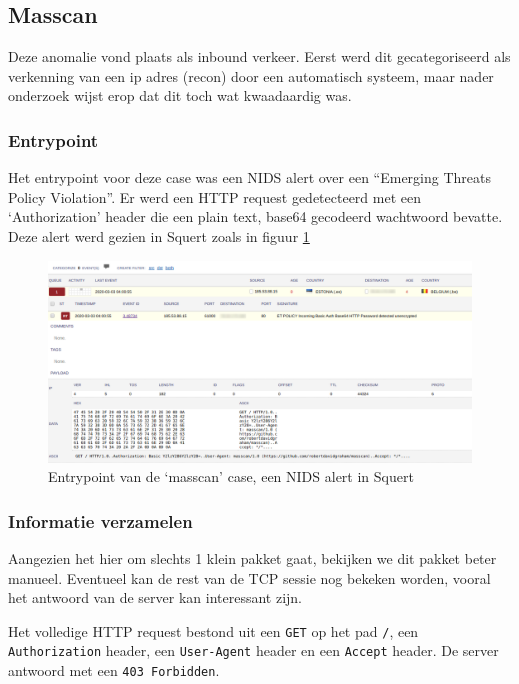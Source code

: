 \documentclass[a4paper, 12pt]{report}
\begin{document}
\subsection{Masscan}
Deze anomalie vond plaats als inbound verkeer.
Eerst werd dit gecategoriseerd als verkenning van een ip adres (recon) door een automatisch systeem, maar nader onderzoek wijst erop dat dit toch wat kwaadaardig was.

\subsubsection{Entrypoint}
Het entrypoint voor deze case was een NIDS alert over een ``Emerging Threats Policy Violation''.
Er werd een HTTP request gedetecteerd met een `Authorization' header die een plain text, base64 gecodeerd wachtwoord bevatte.
Deze alert werd gezien in Squert zoals in figuur \ref{fig:analyse-masscan-entrypoint}

\begin{figure}[H]
  \centering
  \includegraphics[width=\textwidth]{analyse-masscan-entrypoint}
  \caption{Entrypoint van de `masscan' case, een NIDS alert in Squert}
  \label{fig:analyse-masscan-entrypoint}
\end{figure}


\subsubsection{Informatie verzamelen}
Aangezien het hier om slechts 1 klein pakket gaat, bekijken we dit pakket beter manueel.
Eventueel kan de rest van de TCP sessie nog bekeken worden, vooral het antwoord van de server kan interessant zijn.

Het volledige HTTP request bestond uit een \lstinline|GET| op het pad \lstinline|/|, een \lstinline|Authorization| header, een \lstinline|User-Agent| header en een \lstinline|Accept| header.
De server antwoord met een \lstinline|403 Forbidden|.
\end{document}
